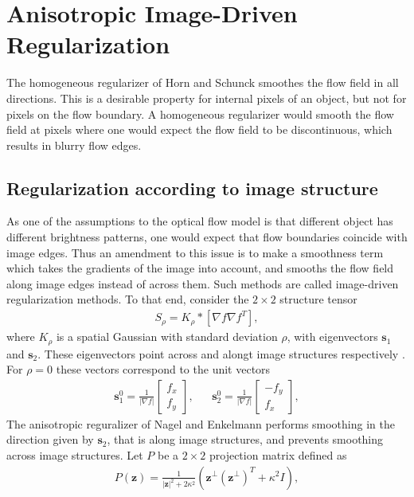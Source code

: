 \chapter{Anisotropic Image-Driven Regularization}
The homogeneous regularizer of Horn and Schunck smoothes the flow field in all directions. This is a desirable property for internal pixels of an object, but not for pixels on the flow boundary. A homogeneous regularizer would smooth the flow field at pixels where one would expect the flow field to be discontinuous, which results in blurry flow edges. 
\section{Regularization according to image structure}
As one of the assumptions to the optical flow model is that different object has different brightness patterns, one would expect that flow boundaries coincide with image edges. Thus an amendment to this issue is to make a smoothness term which takes the gradients of the image into account, and smooths the flow field along image edges instead of across them. Such methods are called image-driven regularization methods. To that end, consider the $2 \times 2$ structure tensor
\begin{align}
S_{\rho} = K_{\rho} * \left[ \nabla f \nabla f^T\right],
\end{align}
where $K_{\rho}$ is a spatial Gaussian with standard deviation $\rho$, with eigenvectors $\textbf{s}_1$ and $\textbf{s}_2$. These eigenvectors point across and alongt image structures respectively \cite{zimmer2011optic}. For $\rho = 0$ these vectors correspond to the unit vectors
\begin{align}
\label{ID_smoothingDir}
&\textbf{s}_1^0 = \frac{1}{|\nabla f|}\begin{bmatrix}
f_x \\
f_y
\end{bmatrix},
& & \textbf{s}_2^0 = \frac{1}{|\nabla f|}\begin{bmatrix}
-f_y \\
f_x
\end{bmatrix}, & 
\end{align}
The anisotropic reguralizer of Nagel and Enkelmann \cite{Nagel:1986:ISC:11284.11285} performs smoothing in the direction given by $\textbf{s}_2$, that is along image structures, and prevents smoothing across image structures. Let $P$ be a $2 \times 2$ projection matrix defined as
\begin{align*}
P(\textbf{z}) = \frac{1}{|\textbf{z}|^2 + 2 \kappa^2} (\textbf{z}^{\bot} (\textbf{z}^{\bot})^T + \kappa^2 I),
\end{align*}
